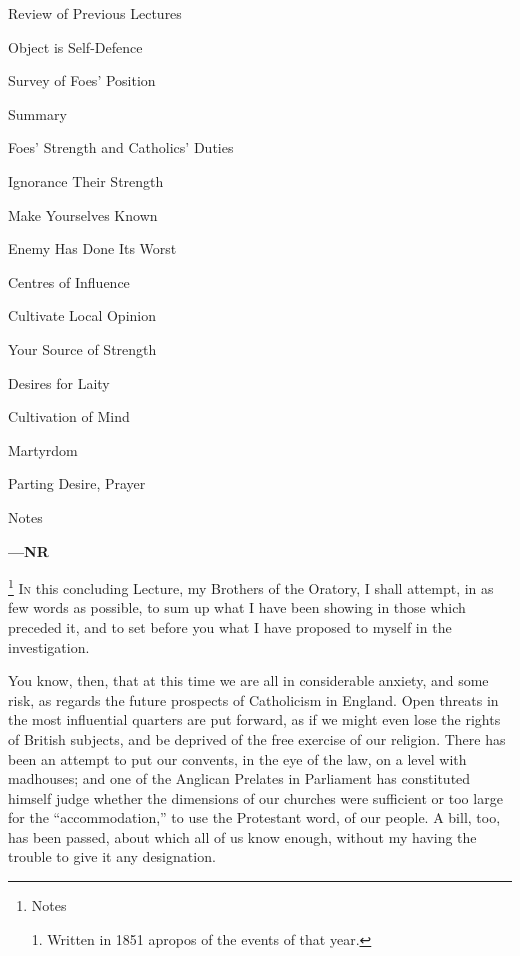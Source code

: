 Review
of Previous Lectures

Object is Self-Defence

Survey of Foes' Position

Summary

Foes'
Strength and Catholics' Duties

Ignorance Their Strength

Make Yourselves Known

Enemy Has Done Its Worst

Centres of Influence

Cultivate Local Opinion

Your Source of Strength

Desires for Laity

Cultivation of Mind

Martyrdom

Parting
Desire, Prayer

Notes

\textbf{—NR}

\footnote{Notes

1. Written in 1851 apropos of the
events of that year.} I\textsc{n} this concluding Lecture, my Brothers of the
Oratory, I shall attempt, in as few words as possible, to
sum up what I have been showing in those which preceded
it, and to set before you what I have proposed to myself
in the investigation.

You know, then, that at this time we are all in
considerable anxiety, and some risk, as regards the
future prospects of Catholicism in England. Open threats
in the most influential quarters are put forward, as if
we might even lose the rights of British subjects, and be
deprived of the free exercise of our religion. There has
been an attempt to put our convents, in the eye of the
law, on a level with madhouses; and one of the Anglican
Prelates in Parliament has constituted himself judge
whether the dimensions of our churches were sufficient or
too large for the ``accommodation,'' to use the
Protestant word, of our people. A bill, too, has been
passed, about which all of us know enough, without my
having the trouble to give it any designation.

